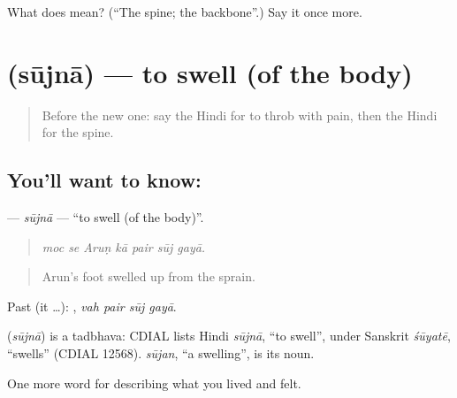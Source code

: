 \begin{tcolorbox}[breakable,colback=teal!4,colframe=teal!35!black,title={Before you move on}]
What does  mean? (\textquotedblleft{}The spine; the backbone\textquotedblright{}.) Say it once more.
\end{tcolorbox}
\section[\texorpdfstring{\hi{सूजना} (sūjnā)}{सूजना (sūjnā)}]{ (sūjnā) — to swell (of the body)}

\label{lesson:HI-C486-sujna}



\begin{quote}
Before the new one: say the Hindi for to throb with pain, then the Hindi for the spine.
\end{quote}

\subsection*{You'll want to know: }
\textbf{} — \emph{sūjnā} — \textquotedblleft{}to swell (of the body)\textquotedblright{}.

\begin{quote}
      
\end{quote}

\begin{quote}
\emph{moc se Aruṇ kā pair sūj gayā.}
\end{quote}

\begin{quote}
Arun's foot swelled up from the sprain.
\end{quote}

Past (it …):    , \emph{vah pair sūj gayā}.

\begin{cousinweb}
\textbf{} (\emph{sūjnā}) is a tadbhava: CDIAL lists Hindi \emph{sūjnā}, \textquotedblleft{}to swell\textquotedblright{}, under Sanskrit \emph{śūyatē}, \textquotedblleft{}swells\textquotedblright{} (CDIAL 12568). \emph{sūjan}, \textquotedblleft{}a swelling\textquotedblright{}, is its noun.
\end{cousinweb}

\begin{grammarlens}[title={What you've built}]
One more word for describing what you lived and felt.
\end{grammarlens}

